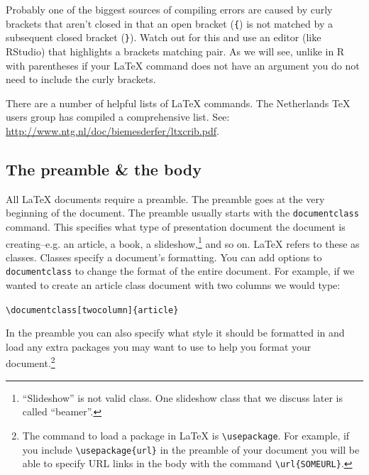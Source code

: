 \noindent Probably one of the biggest sources of compiling errors are caused by curly brackets that aren't closed in that an open bracket (\verb|{|) is not matched by a subsequent closed bracket (\verb|}|). Watch out for this and use an editor (like RStudio) that highlights a brackets matching pair. As we will see, unlike in R with parentheses if your LaTeX command does not have an argument you do not need to include the curly brackets. 

There are a number of helpful lists of LaTeX commands. The Netherlands TeX users group has compiled a comprehensive list. See: \url{http://www.ntg.nl/doc/biemesderfer/ltxcrib.pdf}.

\subsection{The preamble \& the body}\label{LaTeXPreamble}

All LaTeX documents require a preamble. The preamble goes at the very beginning of the document. The preamble usually starts with the \texttt{documentclass} command. This specifies what type of presentation document the document is creating--e.g. an article, a book, a slideshow,\footnote{``Slideshow'' is not valid class. One slideshow class that we discuss later is called ``beamer''.} and so on. LaTeX refers to these as classes. Classes specify a document's formatting. You can add options to \texttt{documentclass} to change the format of the entire document. For example, if we wanted to create an article class document with two columns we would type:

\begin{knitrout}
\color{fgcolor}\begin{kframe}
\begin{alltt}
\textbackslash{}documentclass[twocolumn]\{article\}
\end{alltt}
\end{kframe}
\end{knitrout}


In the preamble you can also specify what style it should be formatted in and load any extra packages you may want to use to help you format your document.\footnote{The command to load a package in LaTeX is \texttt{\textbackslash{}usepackage}. For example, if you include \texttt{\textbackslash{}usepackage\{url\}} in the preamble of your document you will be able to specify URL links in the body with the command \texttt{\textbackslash{}url\{SOMEURL\}}.}

